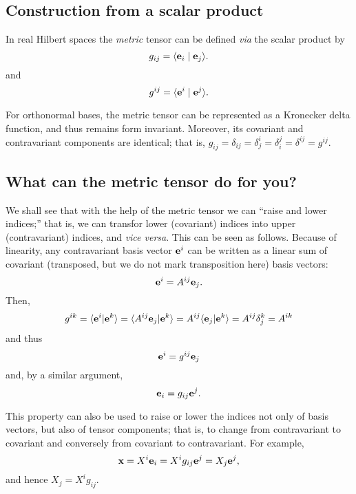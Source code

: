 \subsection{Construction from a scalar product}

In real Hilbert spaces the {\em metric} tensor can be defined {\it via}  the scalar product  by
\begin{equation}
g_{ij}= \langle {\bf e}_i \mid {\bf e}_j\rangle .
\label{2016-m-ch-tensor-gij}
\end{equation}
and
\begin{equation}
g^{ij}= \langle {\bf e}^i \mid {\bf e}^j\rangle .
\label{2016-m-ch-tensor-gij2}
\end{equation}




For orthonormal bases, the metric tensor can be
represented as a Kronecker delta function, and thus  remains form invariant.
Moreover, its covariant and contravariant components are identical; that is,
$g_{ij}=\delta_{ij}=\delta^i_j=\delta_i^j=\delta^{ij}=g^{ij}$.


\subsection{What can the metric tensor do for you?}

We shall see that with the help of the metric tensor we can ``raise and lower indices;''
that is, we can transfor lower (covariant) indices into upper (contravariant) indices, and {\it vice versa}.
This can be seen as follows.
Because of linearity, any contravariant basis vector ${\bf e}^i$
can be written as a linear sum of covariant (transposed, but we do not mark transposition here) basis vectors:
\begin{equation}
{\bf e}^i=A^{ij}{\bf e}_j.
\end{equation}
Then,
\begin{equation}
g^{ik} = \langle {\bf e}^i \vert {\bf e}^k \rangle  =\langle A^{ij}{\bf e}_j\vert  {\bf e}^k  \rangle
=A^{ij}\langle {\bf e}_j \vert  {\bf e}^k\rangle =A^{ij}\delta_j^k=A^{ik}
\end{equation}
and thus
\begin{equation}
{\bf e}^i=g^{ij}{\bf e}_j
\end{equation}
and, by a similar argument,
\begin{equation}
{\bf e}_i=g_{ij}{\bf e}^j.
\end{equation}


This property can also be used to raise or lower the indices not only of basis vectors, but also of tensor components; that is,
to change from contravariant to covariant and conversely from covariant
to contravariant.
For example,
\begin{equation}
{\bf x} =
X^i {\bf e}_i = X^i g_{ij} {\bf e}^j   = X_j {\bf e}^j,
\end{equation}
and hence $X_j = X^i g_{ij}$.

